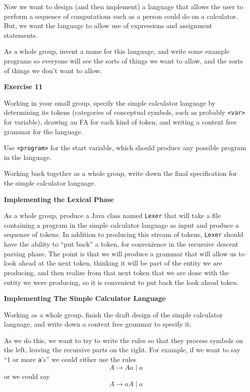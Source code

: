 Now we want to design (and then implement) a language that allows the user to
perform a sequence of computations such as a person could do on a calculator.
But, we want the language to allow use of expressions and assignment statements.
\medskip

\doit As a whole group, invent a name for this language, and write some example programs
so everyone will see the sorts of things we want to allow, and the sorts of things we don't want
to allow.
\border

{\bf Exercise 11}
\medskip

Working in your small group, specify the simple calculator language by determining its
tokens (categories of conceptual symbols, such as probably {\tt <var>} for variable),
drawing an FA for each kind of token, and writing a context free grammar for the
language. 
\medskip

Use {\tt <program>} for the start variable, which should produce any possible program in the
language.
\border

\doit Working back together as a whole group, write down the final  specification
for the simple calculator language.
\border

{\bf Implementing the Lexical Phase}
\medskip

\doit As a whole group, produce a Java class named {\tt Lexer} that
will take a file containing a program in the simple calculator language as input and produce a sequence of tokens.
In addition to producing this stream of tokens, {\tt Lexer} should have the ability to ``put back'' a token, for convenience
in the recursive descent parsing phase.  The point is that we will produce a grammar that will allow us to
look ahead at the next token, thinking it will be part of the entity we are producing, and then realize from that next token
that we are done with the entity we were producing, so it is convenient to put back the look ahead token.

\vfil\eject

{\bf Implementing The Simple Calculator Language}
\medskip

\doit
 Working as a whole group,
 finish the draft design of the simple calculator language,
and write down a context free grammar to specify it.  
\medskip

As we do this, we want to try to write the rules so that they process symbols on the
left, leaving the recursive parts on the right.
For example, if we want to say ``1 or more {\tt a}'s'' we could either use the
rules
$$ A \rightarrow Aa \;  \vert \; a $$
or we could say
$$ A \rightarrow aA \; \vert \; a $$

